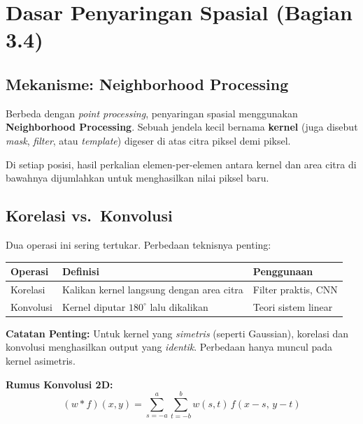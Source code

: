 \documentclass[12pt,a4paper]{article}
\begin{document}
\section{Dasar Penyaringan Spasial (Bagian 3.4)}

\subsection{Mekanisme: Neighborhood Processing}

Berbeda dengan \textit{point processing}, penyaringan spasial menggunakan \textbf{Neighborhood Processing}. Sebuah jendela kecil bernama \textbf{kernel} (juga disebut \textit{mask}, \textit{filter}, atau \textit{template}) digeser di atas citra piksel demi piksel.

Di setiap posisi, hasil perkalian elemen-per-elemen antara kernel dan area citra di bawahnya dijumlahkan untuk menghasilkan nilai piksel baru.

\subsection{Korelasi vs.\ Konvolusi}

Dua operasi ini sering tertukar. Perbedaan teknisnya penting:

\begin{center}
\begin{tabular}{lll}
\toprule
\textbf{Operasi} & \textbf{Definisi} & \textbf{Penggunaan} \\
\midrule
Korelasi & Kalikan kernel langsung dengan area citra & Filter praktis, CNN \\
Konvolusi & Kernel diputar $180^\circ$ lalu dikalikan & Teori sistem linear \\
\bottomrule
\end{tabular}
\end{center}

\begin{notebox}
\textbf{Catatan Penting:} Untuk kernel yang \textit{simetris} (seperti Gaussian), korelasi dan konvolusi menghasilkan output yang \textit{identik}. Perbedaan hanya muncul pada kernel asimetris.
\end{notebox}

\textbf{Rumus Konvolusi 2D:}
\begin{equation}
  (w * f)(x, y) = \sum_{s=-a}^{a} \sum_{t=-b}^{b} w(s,t)\, f(x-s,\, y-t)
  \label{eq:convolution_2d}
\end{equation}
\end{document}
